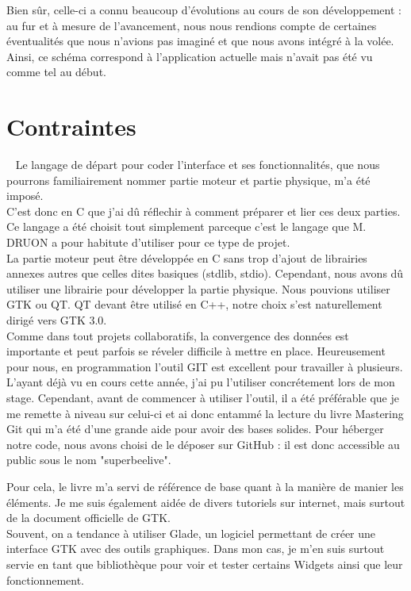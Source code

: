 \documentclass[11pt,french,a4paper]{report}
\begin{document}
Bien sûr, celle-ci a connu beaucoup d'évolutions au cours de son développement : au fur et à mesure de l'avancement,
nous nous rendions compte de certaines éventualités que nous n'avions pas imaginé et que nous avons intégré à la volée. 
Ainsi, ce schéma correspond à l'application actuelle mais n'avait pas été vu comme tel au début. 
\\

    \section{Contraintes} 
Le langage de départ pour coder l'interface et ses fonctionnalités, que nous pourrons familiairement nommer partie moteur 
et partie physique, m'a été imposé. \\
C'est donc en C que j'ai dû réflechir à comment préparer et lier ces deux parties. Ce langage a été choisit tout simplement 
parceque c'est  le langage que M. DRUON a pour habitute d'utiliser pour ce type de projet. \\
La partie moteur peut être développée en C sans trop d'ajout de librairies annexes autres que celles dites basiques 
(stdlib, stdio). 
Cependant, nous avons dû utiliser une librairie pour développer la partie physique. Nous pouvions utiliser GTK ou QT. 
QT devant être utilisé en C++, notre choix s'est naturellement dirigé vers GTK 3.0. \\
Comme dans tout projets collaboratifs, la convergence des données est importante et peut parfois se réveler difficile à mettre en place. 
Heureusement pour nous, en programmation l'outil GIT est excellent pour travailler à plusieurs. L'ayant déjà vu en cours cette année,
j'ai pu l'utiliser concrétement lors de mon stage. Cependant, avant de commencer à utiliser l'outil, il a été préférable que 
je me remette à niveau sur celui-ci et ai donc entammé la lecture du livre Mastering Git %
qui m'a été d'une grande aide pour avoir des bases solides. Pour héberger notre code, nous avons choisi de le déposer sur GitHub : 
il est donc accessible au public sous le nom "superbeelive". %

Pour cela, le livre %
m'a servi de référence de base quant à la manière de manier les éléments. Je me suis également aidée de divers tutoriels sur internet,
mais surtout de la document officielle de GTK. %
\\
Souvent, on a tendance à utiliser Glade, un logiciel permettant de créer une interface GTK avec des outils graphiques. 
Dans mon cas, je m'en suis surtout servie en tant que bibliothèque pour voir et tester certains Widgets ainsi que leur fonctionnement. 
\end{document}
